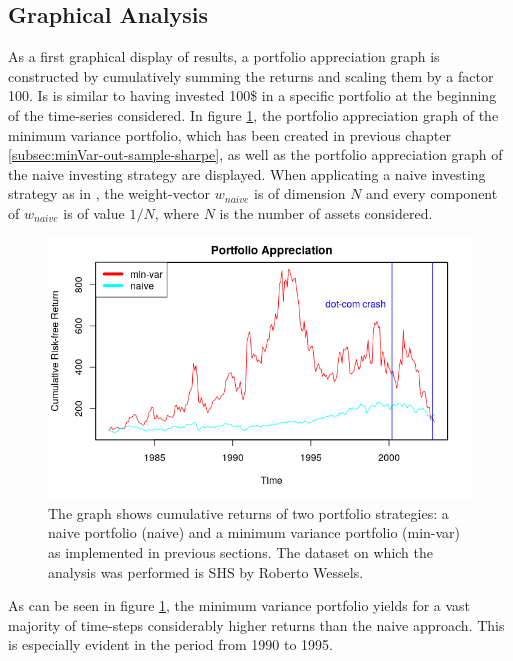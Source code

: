 \subsection{Graphical Analysis}
As a first graphical display of results, a portfolio appreciation graph is constructed by cumulatively summing the returns and scaling them by a factor 100. Is is similar to having invested 100\$ in a specific portfolio at the beginning of the time-series considered. In figure \ref{fig:appreciation_graph}, the portfolio appreciation graph of the minimum variance portfolio, which has been created in previous chapter \ref{subsec:minVar-out-sample-sharpe}, as well as the portfolio appreciation graph of the naive investing strategy are displayed. When applicating a naive investing strategy as in \cite{DEM09}, the weight-vector $w_{naive}$ is of dimension $N$ and every component of $w_{naive}$ is of value $1/N$, where $N$ is the number of assets considered.

\begin{figure}[h]
  \begin{center}
    \includegraphics[width=\textwidth]{Bilder/portfolio-appreciation.png}
    \caption{The graph shows cumulative returns of two portfolio strategies: a naive portfolio (naive) and a minimum variance portfolio (min-var) as implemented in previous sections. The dataset on which the analysis was performed is SHS by Roberto Wessels.}
    \label{fig:appreciation_graph}
  \end{center}
\end{figure}

As can be seen in figure \ref{fig:appreciation_graph}, the minimum variance portfolio yields for a vast majority of time-steps considerably higher returns than the naive approach. This is especially evident in the period from 1990 to 1995. \\


